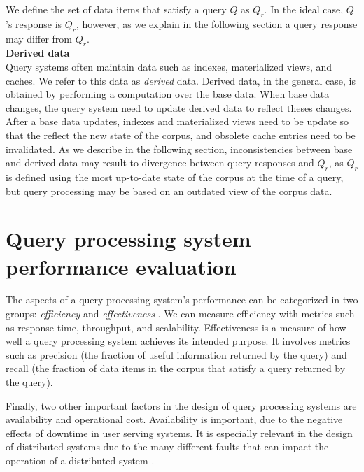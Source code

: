 We define the set of data items that satisfy a query $Q$ as $Q_r$.
In the ideal case, $Q$'s response is $Q_r$, however, as we explain in the following section a query response may
differ from $Q_r$. \\

\noindent
\textbf{Derived data} \\
Query systems often maintain data such as indexes, materialized views, and caches.
We refer to this data as \textit{derived} data.
Derived data, in the general case, is obtained by performing a computation over the base data.
When base data changes, the query system need to update derived data to reflect theses changes.
After a base data updates, indexes and materialized views need to be update so that the reflect the new state of the corpus,
and obsolete cache entries need to be invalidated.
As we describe in the following section, inconsistencies between base and derived data may result to divergence between
query responses and $Q_r$, as $Q_r$ is defined using the most up-to-date state of the corpus at the time of a query, but
query processing may be based on an outdated view of the corpus data.

\section{Query processing system performance evaluation}
\label{sec:requirements}


The aspects of a query processing system's performance can be categorized in two groups:
\textit{efficiency} and \textit{effectiveness} \cite{buttcher:informationretrieval}.
We can measure efficiency with metrics such as response time, throughput, and scalability.
Effectiveness is a measure of how well a query processing system achieves its intended purpose.
It involves metrics such as precision (the fraction of useful information returned by the query) and recall
(the fraction of data items in the corpus that satisfy a query returned by the query).

Finally, two other important factors in the design of query processing systems are availability and operational cost.
Availability is important, due to the negative effects of downtime in user serving systems.
It is especially relevant in the design of distributed systems due to the many different faults that can impact the
operation of a distributed system \cite{kleppmann:designing}.

